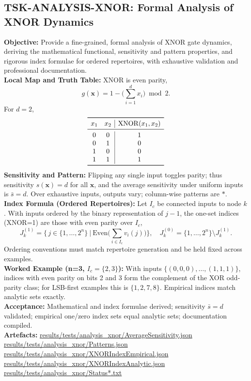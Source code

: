 \documentclass[11pt]{article}
\begin{document}
\subsection{TSK-ANALYSIS-XNOR: Formal Analysis of XNOR Dynamics}
\textbf{Objective:} Provide a fine-grained, formal analysis of XNOR gate dynamics, deriving the mathematical functional, sensitivity and pattern properties, and rigorous index formulae for ordered repertoires, with exhaustive validation and professional documentation.\\
\textbf{Local Map and Truth Table:} XNOR is even parity,
\[
g(\mathbf{x}) = 1 - \big(\sum_{i=1}^{d} x_i\big)\bmod 2.
\]
For \(d=2\),
\[
\begin{array}{cc|c}
\toprule
 x_1 & x_2 & \mathrm{XNOR}(x_1,x_2) \\
\midrule
 0 & 0 & 1 \\
 0 & 1 & 0 \\
 1 & 0 & 0 \\
 1 & 1 & 1 \\
\bottomrule
\end{array}
\]
\textbf{Sensitivity and Pattern:} Flipping any single input toggles parity; thus sensitivity \(s(\mathbf{x})=d\) for all \(\mathbf{x}\), and the average sensitivity under uniform inputs is \(\bar{s}=d\). Over exhaustive inputs, outputs vary; column-wise patterns are \(*\).\\
\textbf{Index Formula (Ordered Repertoires):} Let \(I_c\) be connected inputs to node \(k\). With inputs ordered by the binary representation of \(j-1\), the one-set indices (XNOR=1) are those with even parity over \(I_c\),
\[
J_k^{(1)} = \big\{\, j \in \{1,\dots,2^n\} \ \big|\ \mathrm{Even}\big(\sum_{i\in I_c} v_i(j)\big) \big\},\quad J_k^{(0)} = \{1,\dots,2^n\} \setminus J_k^{(1)}.
\]
Ordering conventions must match repertoire generation and be held fixed across examples.\\
\textbf{Worked Example (n=3, \(I_c=\{2,3\}\)):} With inputs \(\{(0,0,0),\dots,(1,1,1)\}\), indices with even parity on bits 2 and 3 form the complement of the XOR odd-parity class; for LSB-first examples this is \(\{1,2,7,8\}\). Empirical indices match analytic sets exactly.\\
\textbf{Acceptance:} Mathematical and index formulae derived; sensitivity \(\bar{s}=d\) validated; empirical one/zero index sets equal analytic sets; documentation compiled.\\
\textbf{Artefacts:} \url{results/tests/analysis_xnor/AverageSensitivity.json}\\
\url{results/tests/analysis_xnor/Patterns.json}\\
\url{results/tests/analysis_xnor/XNORIndexEmpirical.json}\\
\url{results/tests/analysis_xnor/XNORIndexAnalytic.json}\\
\url{results/tests/analysis_xnor/Status*.txt}
\end{document}
